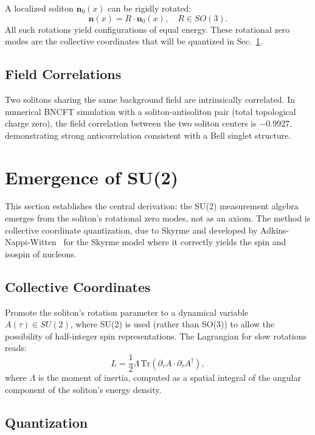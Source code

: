 \documentclass[11pt,a4paper]{article}
\begin{document}
A localized soliton $\mathbf{n}_0(x)$ can be rigidly rotated:
\begin{equation}
\mathbf{n}(x) = R \cdot \mathbf{n}_0(x), \quad R \in SO(3).
\end{equation}
All such rotations yield configurations of equal energy. These rotational zero modes are the collective coordinates that will be quantized in Sec.~\ref{sec:emergence}.

\subsection{Field Correlations}

Two solitons sharing the same background field are intrinsically correlated. In numerical BNCFT simulation with a soliton-antisoliton pair (total topological charge zero), the field correlation between the two soliton centers is $-0.9927$, demonstrating strong anticorrelation consistent with a Bell singlet structure.

\section{Emergence of SU(2)}
\label{sec:emergence}

This section establishes the central derivation: the SU(2) measurement algebra emerges from the soliton's rotational zero modes, not as an axiom. The method is collective coordinate quantization, due to Skyrme and developed by Adkins-Nappi-Witten~\cite{anw1983,witten1983} for the Skyrme model where it correctly yields the spin and isospin of nucleons.

\subsection{Collective Coordinates}

Promote the soliton's rotation parameter to a dynamical variable $A(\tau) \in SU(2)$, where SU(2) is used (rather than SO(3)) to allow the possibility of half-integer spin representations. The Lagrangian for slow rotations reads:
\begin{equation}
L = \frac{1}{2}\Lambda\, \text{Tr}(\partial_\tau A \cdot \partial_\tau A^\dagger),
\end{equation}
where $\Lambda$ is the moment of inertia, computed as a spatial integral of the angular component of the soliton's energy density.

\subsection{Quantization}
\end{document}

